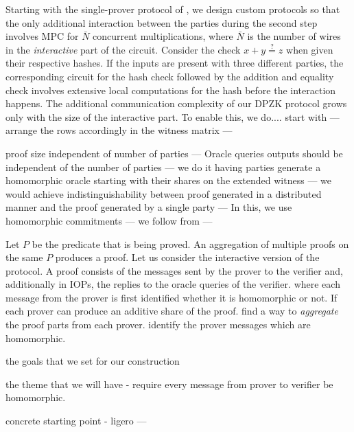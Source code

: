 Starting with the single-prover protocol of \cite{ours}, we design custom protocols so that the only additional interaction between the parties during the second step involves MPC for $\bar{N}$ concurrent multiplications, where $\bar{N}$ is the number of wires in the \textit{interactive} part of the circuit. Consider the check $x+y \stackrel{?}{=} z$ when given their respective hashes. If the inputs are present with three different parties, the corresponding circuit for the hash check followed by the addition and equality check involves extensive local computations for the hash before the interaction happens.  The additional communication complexity of our DPZK protocol grows only with the size of the interactive part. To enable this, we do.... start with \cite{ours} --- arrange the rows accordingly in the witness matrix --- 

proof size independent of number of parties --- Oracle queries outputs should be independent of the number of parties --- we do it having parties generate a homomorphic oracle starting with their shares on the extended witness --- we would achieve indistinguishability between proof generated in a distributed manner and the proof generated by a single party ---
In this, we use homomorphic commitments --- we follow from \cite{ours} --- 

Let $P$ be the predicate that is being proved. An aggregation of multiple proofs on the same $P$ produces a proof.  Let us consider the interactive version of the protocol. A proof consists of the messages sent by the prover to the verifier and, additionally in IOPs, the replies to the oracle queries of the verifier.
where each message from the prover is first identified whether it is homomorphic or not. If 
each prover can produce an additive share of the proof.  find a way to \textit{aggregate} the proof parts from each prover. identify the prover messages which are homomorphic.

the goals that we set for our construction

the theme that we will have - require every message from prover to verifier be homomorphic.

concrete starting point - ligero --- 